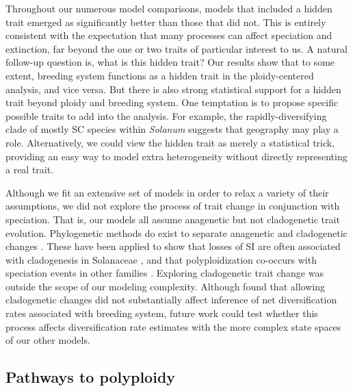 
Throughout our numerous model comparisons, models that included a hidden trait emerged as significantly better than those that did not. %
This is entirely consistent with the expectation that many processes can affect speciation and extinction, far beyond the one or two traits of particular interest to us.
A natural follow-up question is, what is this hidden trait?
Our results show that to some extent, breeding system functions as a hidden trait in the ploidy-centered analysis, and vice versa.
But there is also strong statistical support for a hidden trait beyond ploidy and breeding system.
One temptation is to propose specific possible traits to add into the analysis.
For example, the rapidly-diversifying clade of mostly SC species within \emph{Solanum} suggests that geography may play a role. %
Alternatively, we could view the hidden trait as merely a statistical trick, providing an easy way to model extra heterogeneity without directly representing a real trait.

Although we fit an extensive set of models in order to relax a variety of their assumptions, we did not explore the process of trait change in conjunction with speciation.
That is, our models all assume anagenetic but not cladogenetic trait evolution.
Phylogenetic methods do exist to separate anagenetic and cladogenetic changes \citep{mayrose_2011, goldberg_2012, magnuson-ford_2012}.
These have been applied to show that losses of SI are often associated with cladogenesis in Solanaceae \citep{goldberg_2012}, and that polyploidization co-occurs with speciation events in other families \citep{zhan_2016, freyman_2017}.
Exploring cladogenetic trait change was outside the scope of our modeling complexity.
Although \citet{goldberg_2012} found that allowing cladogenetic changes did not substantially affect inference of net diversification rates associated with breeding system, future work could test whether this process affects diversification rate estimates with the more complex state spaces of our other models.

\subsection{Pathways to polyploidy}


